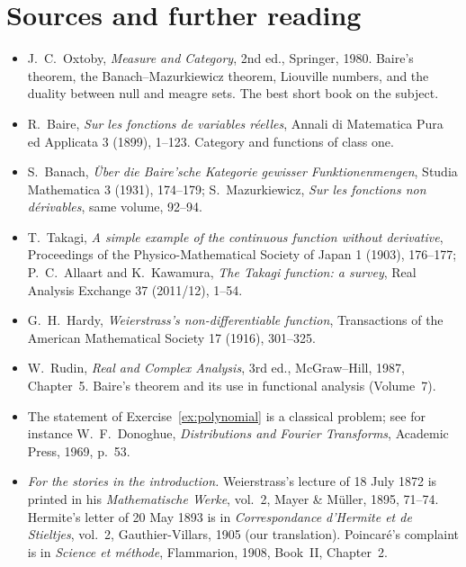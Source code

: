 \section*{Sources and further reading}

\begin{itemize}
\item J.~C.~Oxtoby, \emph{Measure and Category}, 2nd ed., Springer, 1980. Baire's theorem, the Banach--Mazurkiewicz theorem, Liouville
numbers, and the duality between null and meagre sets. The best short book on the subject.
\item R.~Baire, \emph{Sur les fonctions de variables r\'eelles}, Annali di Matematica Pura ed Applicata 3 (1899), 1--123. Category and
functions of class one.
\item S.~Banach, \emph{\"Uber die Baire'sche Kategorie gewisser Funktionenmengen}, Studia Mathematica 3 (1931), 174--179; S.~Mazurkiewicz,
\emph{Sur les fonctions non d\'erivables}, same volume, 92--94.
\item T.~Takagi, \emph{A simple example of the continuous function without derivative}, Proceedings of the Physico-Mathematical
Society of Japan 1 (1903), 176--177; P.~C.~Allaart and K.~Kawamura, \emph{The Takagi function: a survey}, Real Analysis Exchange 37
(2011/12), 1--54.
\item G.~H.~Hardy, \emph{Weierstrass's non-differentiable function}, Transactions of the American Mathematical Society 17 (1916), 301--325.
\item W.~Rudin, \emph{Real and Complex Analysis}, 3rd ed., McGraw--Hill, 1987, Chapter~5. Baire's theorem and its use in functional analysis
(Volume~7).
\item The statement of Exercise~\ref{ex:polynomial} is a classical problem; see for instance W.~F.~Donoghue, \emph{Distributions and Fourier Transforms},
Academic Press, 1969, p.~53.
\item \emph{For the stories in the introduction.} Weierstrass's lecture of 18 July 1872 is printed in his \emph{Mathematische Werke}, vol.~2, Mayer \& M\"uller, 1895, 71--74. Hermite's
letter of 20 May 1893 is in \emph{Correspondance d'Hermite et de Stieltjes}, vol.~2, Gauthier-Villars, 1905 (our translation). Poincar\'e's complaint is in \emph{Science et m\'ethode},
Flammarion, 1908, Book~II, Chapter~2.
\end{itemize}

